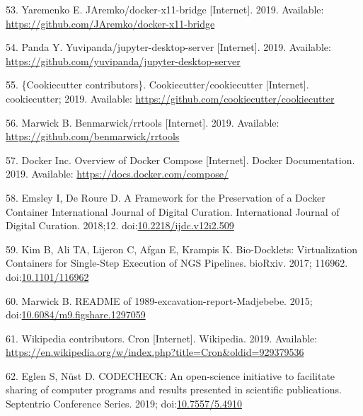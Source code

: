 \documentclass[10pt,letterpaper]{article}
\begin{document}
\leavevmode\hypertarget{ref-yaremenko_docker-x11-bridge_2019}{}%
53. Yaremenko E. JAremko/docker-x11-bridge {[}Internet{]}. 2019.
Available: \url{https://github.com/JAremko/docker-x11-bridge}

\leavevmode\hypertarget{ref-yuvipanda_jupyter-desktop-server_2019}{}%
54. Panda Y. Yuvipanda/jupyter-desktop-server {[}Internet{]}. 2019.
Available: \url{https://github.com/yuvipanda/jupyter-desktop-server}

\leavevmode\hypertarget{ref-cookiecutter_contributors_cookiecutter_2019}{}%
55. \{Cookiecutter contributors\}. Cookiecutter/cookiecutter
{[}Internet{]}. cookiecutter; 2019. Available:
\url{https://github.com/cookiecutter/cookiecutter}

\leavevmode\hypertarget{ref-marwick_rrtools_2019}{}%
56. Marwick B. Benmarwick/rrtools {[}Internet{]}. 2019. Available:
\url{https://github.com/benmarwick/rrtools}

\leavevmode\hypertarget{ref-docker-compose_2019}{}%
57. Docker Inc. Overview of Docker Compose {[}Internet{]}. Docker
Documentation. 2019. Available: \url{https://docs.docker.com/compose/}

\leavevmode\hypertarget{ref-emsley_framework_2018}{}%
58. Emsley I, De Roure D. A Framework for the Preservation of a Docker
Container International Journal of Digital Curation. International
Journal of Digital Curation. 2018;12.
doi:\href{https://doi.org/10.2218/ijdc.v12i2.509}{10.2218/ijdc.v12i2.509}

\leavevmode\hypertarget{ref-kim_bio-docklets_2017}{}%
59. Kim B, Ali TA, Lijeron C, Afgan E, Krampis K. Bio-Docklets:
Virtualization Containers for Single-Step Execution of NGS Pipelines.
bioRxiv. 2017; 116962.
doi:\href{https://doi.org/10.1101/116962}{10.1101/116962}

\leavevmode\hypertarget{ref-marwick_readme_2015}{}%
60. Marwick B. README of 1989-excavation-report-Madjebebe. 2015;
doi:\href{https://doi.org/10.6084/m9.figshare.1297059}{10.6084/m9.figshare.1297059}

\leavevmode\hypertarget{ref-wikipedia_contributors_cron_2019}{}%
61. Wikipedia contributors. Cron {[}Internet{]}. Wikipedia. 2019.
Available:
\url{https://en.wikipedia.org/w/index.php?title=Cron\&oldid=929379536}

\leavevmode\hypertarget{ref-eglen_codecheck_2019}{}%
62. Eglen S, Nüst D. CODECHECK: An open-science initiative to facilitate
sharing of computer programs and results presented in scientific
publications. Septentrio Conference Series. 2019;
doi:\href{https://doi.org/10.7557/5.4910}{10.7557/5.4910}
\end{document}
